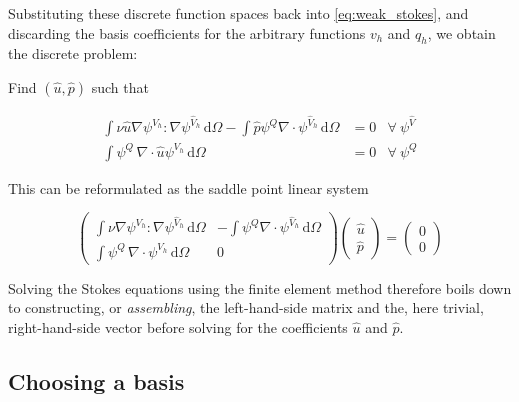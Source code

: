 \documentclass[thesis]{subfiles}
\begin{document}
Substituting these discrete function spaces back into \cref{eq:weak_stokes}, and discarding the basis coefficients for the arbitrary functions $v_h$ and $q_h$, we obtain the discrete problem:

\vspace{1em}

Find $(\hat u, \hat p)$ such that

\begin{subequations}
  \begin{align}
    \int \nu \hat u \nabla \psi^{V_h} : \nabla \psi^{\hat V_h} \, \textrm{d}\Omega
    - \int \hat p \psi^Q \nabla \cdot \psi^{\hat V_h} \, \textrm{d}\Omega
    &= 0
    &\forall \ \psi^{\hat V} \\
    \int \psi^Q \, \nabla \cdot \hat u \psi^{V_h} \, \textrm{d}\Omega
    &= 0
    &\forall \ \psi^{Q}
  \end{align}
  \label{eq:weak_stokes_discrete}
\end{subequations}

This can be reformulated as the saddle point linear system

\begin{equation}
  \left (
  \begin{array}{c|c}
    \int \nu \nabla \psi^{V_h} : \nabla \psi^{\hat V_h} \, \textrm{d}\Omega
    &
    - \int \psi^Q \nabla \cdot \psi^{\hat V_h} \, \textrm{d}\Omega \\
    \hline
    \int \psi^Q \, \nabla \cdot \psi^{V_h} \, \textrm{d}\Omega
    &
    0
  \end{array}
  \right )
  \left (
  \begin{array}{c}
    \hat u \\
    \hline
    \hat p
  \end{array}
  \right )
  =
  \left (
  \begin{array}{c}
    0 \\ \hline 0
  \end{array}
  \right )
  \label{eq:stokes_linear_system}
\end{equation}

Solving the Stokes equations using the finite element method therefore boils down to constructing, or \textit{assembling}, the left-hand-side matrix and the, here trivial, right-hand-side vector before solving for the coefficients $\hat u$ and $\hat p$.

\subsection{Choosing a basis}
\end{document}

